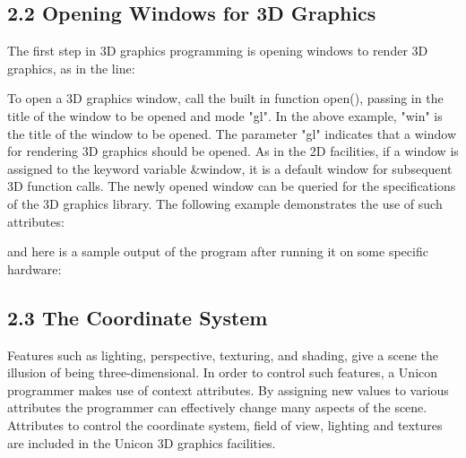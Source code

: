 \documentclass[letterpaper]{article}
\begin{document}
\subsection[2.2 Opening Windows for 3D Graphics]
{2.2 Opening Windows for 3D Graphics}


The first step in 3D graphics programming is opening windows to render
3D graphics, as in the line:



\bigskip

To open a 3D graphics window, call the built in function
\textsf{open()}, passing in the title of the window to be
opened and mode \textsf{"gl"}. In the above example,
\textsf{"win"} is the title of the window to be opened. The
parameter \textsf{"gl"} indicates that a window for rendering 3D
graphics should be opened. As in the 2D facilities, if a window is
assigned to the keyword variable \textsf{\&window}, it is a default
window for subsequent 3D function calls. The newly opened window can
be queried for the specifications of the 3D graphics library. The
following example demonstrates the use of such attributes:


\noindent
and here is a sample output of the program after running it on
some specific hardware:



\subsection[2.3 The Coordinate System]{2.3 The Coordinate System}

Features such as lighting, perspective, texturing, and shading, give
a scene the illusion of being three-dimensional. In order to control
such features, a Unicon programmer makes use of context attributes.
By assigning new values to various attributes the programmer can
effectively change many aspects of the scene. Attributes to control
the coordinate system, field of view, lighting and textures are
included in the Unicon 3D graphics facilities.
\end{document}
